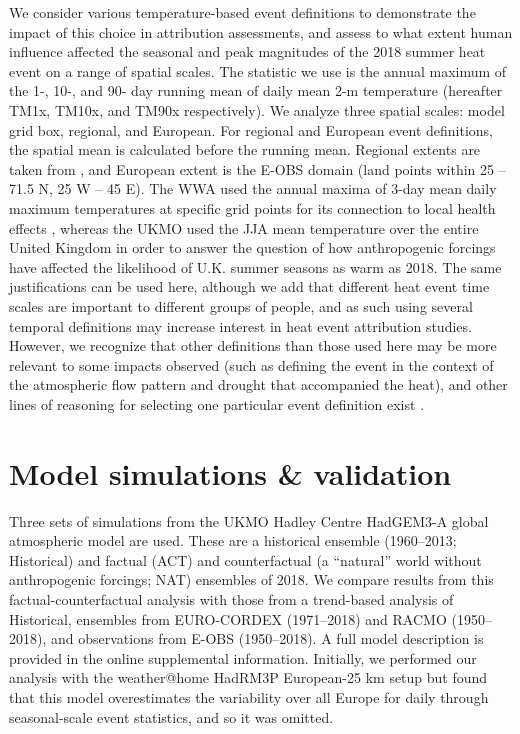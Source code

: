  We consider various temperature-based event definitions to demonstrate the impact of this choice in attribution assessments, and assess to what extent human influence affected the seasonal and peak magnitudes of the 2018 summer heat event on a range of spatial scales. The statistic we use is the annual maximum of the 1-, 10-, and 90- day running mean of daily mean 2-m temperature (hereafter TM1x, TM10x, and TM90x respectively). We analyze three spatial scales: model grid box, regional, and European. For regional and European event definitions, the spatial mean is calculated before the running mean. Regional extents are taken from \citet{christensen_summary_2007}, and European extent is the E-OBS \citep{cornes_ensemble_2018} domain (land points within 25 -- 71.5\textdegree{} N, 25\textdegree{} W -- 45\textdegree{} E). The WWA used the annual maxima of 3-day mean daily maximum temperatures at specific grid points for its connection to local health effects \citep{dippoliti_impact_2010}, whereas the UKMO used the JJA mean temperature over the entire United Kingdom in order to answer the question of how anthropogenic forcings have affected the likelihood of U.K. summer seasons as warm as 2018. The same justifications can be used here, although we add that different heat event time scales are important to different groups of people, and as such using several temporal definitions may increase interest in heat event attribution studies. However, we recognize that other definitions than those used here may be more relevant to some impacts observed (such as defining the event in the context of the atmospheric flow pattern and drought that accompanied the heat), and other lines of reasoning for selecting one particular event definition exist \citep{cattiaux_defining_2018}.

\section{Model simulations \& validation}

  Three sets of simulations from the UKMO Hadley Centre HadGEM3-A global atmospheric model \citep{christidis_new_2013,ciavarella_upgrade_2018} are used. These are a historical ensemble (1960--2013; Historical) and factual (ACT) and counterfactual (a “natural” world without anthropogenic forcings; NAT) ensembles of 2018. We compare results from this factual-counterfactual analysis with those from a trend-based analysis of Historical, ensembles from EURO-CORDEX \citep{vautard_simulation_2013,jacob_euro-cordex_2014,vrac_influence_2017} (1971--2018) and RACMO \citep{aalbers_local-scale_2018,lenderink_preparing_2014} (1950--2018), and observations from E-OBS (1950--2018). A full model description is provided in the online supplemental information. Initially, we performed our analysis with the weather@home HadRM3P European-25 km setup \citep{massey_weatherhome-development_2015} but found that this model overestimates the variability over all Europe for daily through seasonal-scale event statistics, and so it was omitted.

